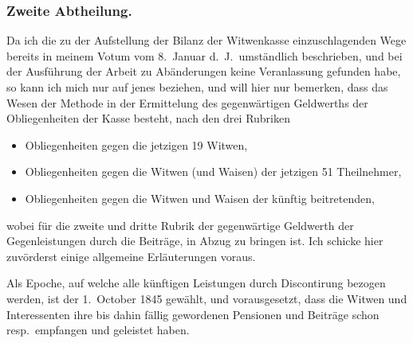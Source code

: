\documentclass[12pt,a4paper]{article}
\begin{document}
\subsubsection*{Zweite Abtheilung.}

Da ich die zu der Aufstellung der Bilanz der Witwenkasse einzuschlagenden Wege bereits in meinem Votum vom 8.\ Januar d.\ J.\ umst\"andlich beschrieben, und bei der Ausf\"uhrung der Arbeit zu Ab\"anderungen keine Veranlassung gefunden habe, so kann ich mich nur auf jenes beziehen, und will hier nur bemerken, dass das Wesen der Methode in der Ermittelung des gegenw\"artigen Geldwerths der Obliegenheiten der Kasse besteht, nach den drei Rubriken
\begin{itemize}
\item[] Obliegenheiten gegen die jetzigen 19 Witwen,
\item[] Obliegenheiten gegen die Witwen (und Waisen) der jetzigen 51 Theilnehmer,
\item[] Obliegenheiten gegen die Witwen und Waisen der k\"unftig beitretenden,
\end{itemize}
wobei f\"ur die zweite und dritte Rubrik der gegenw\"artige Geldwerth der Gegenleistungen durch die Beitr\"age, in Abzug zu bringen ist. Ich schicke hier zuv\"orderst einige allgemeine Erl\"auterungen voraus.

Als Epoche, auf welche alle k\"unftigen Leistungen durch Discontirung bezogen werden, ist der 1.\ October 1845 gew\"ahlt, und vorausgesetzt, dass die Witwen und Interessenten ihre bis dahin f\"allig gewordenen Pensionen und Beitr\"age schon resp.\ empfangen und geleistet haben.
\end{document}
